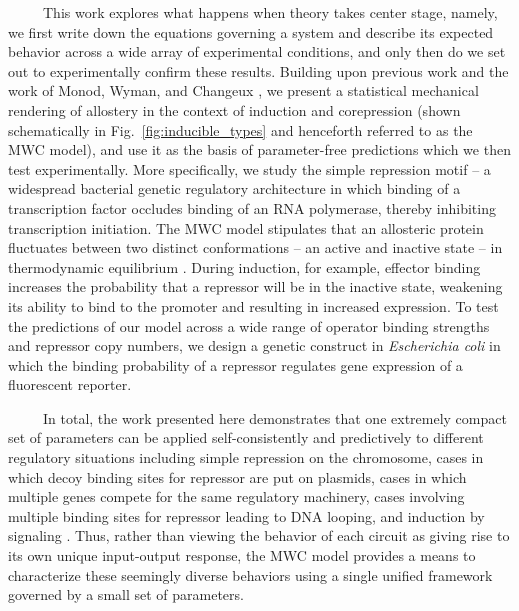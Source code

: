 \documentclass[12pt]{caltech_thesis}
\begin{document}
~~~~~This work explores what happens when theory takes center stage,
namely, we first write down the equations governing a system and
describe its expected behavior across a wide array of experimental
conditions, and only then do we set out to experimentally confirm these
results. Building upon previous work
\autocite{garcia2011,brewster2014,weinert2014} and the work of Monod,
Wyman, and Changeux \autocite{monod1965}, we present a statistical
mechanical rendering of allostery in the context of induction and
corepression (shown schematically in Fig.~\ref{fig:inducible_types} and
henceforth referred to as the MWC model), and use it as the basis of
parameter-free predictions which we then test experimentally. More
specifically, we study the simple repression motif -- a widespread
bacterial genetic regulatory architecture in which binding of a
transcription factor occludes binding of an RNA polymerase, thereby
inhibiting transcription initiation. The MWC model stipulates that an
allosteric protein fluctuates between two distinct conformations -- an
active and inactive state -- in thermodynamic equilibrium
\autocite{monod1965}. During induction, for example, effector binding
increases the probability that a repressor will be in the inactive
state, weakening its ability to bind to the promoter and resulting in
increased expression. To test the predictions of our model across a wide
range of operator binding strengths and repressor copy numbers, we
design a genetic construct in \emph{Escherichia coli} in which the
binding probability of a repressor regulates gene expression of a
fluorescent reporter.

~~~~~In total, the work presented here demonstrates that one extremely
compact set of parameters can be applied self-consistently and
predictively to different regulatory situations including simple
repression on the chromosome, cases in which decoy binding sites for
repressor are put on plasmids, cases in which multiple genes compete for
the same regulatory machinery, cases involving multiple binding sites
for repressor leading to DNA looping, and induction by signaling
\autocite{garcia2011,garcia2011b,brewster2012,brewster2014,boedicker2013a,boedicker2013}.
Thus, rather than viewing the behavior of each circuit as giving rise to
its own unique input-output response, the MWC model provides a means to
characterize these seemingly diverse behaviors using a single unified
framework governed by a small set of parameters.
\end{document}
